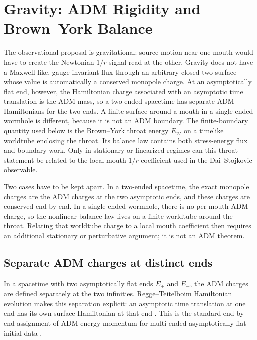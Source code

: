 \documentclass[aps,prd,10pt,onecolumn,nofootinbib,superscriptaddress,floatfix]{revtex4-2}
\begin{document}
\FloatBarrier

\section{Gravity: ADM Rigidity and Brown--York Balance}
\label{sec:gravity}

The observational proposal is gravitational: source motion near one mouth would
have to create the Newtonian $1/r$ signal read at the other.  Gravity does not
have a Maxwell-like, gauge-invariant flux through an arbitrary closed
two-surface whose value is automatically a conserved monopole charge.  At an
asymptotically flat end, however, the Hamiltonian charge associated with an
asymptotic time translation is the ADM mass, so a two-ended spacetime has
separate ADM Hamiltonians for the two ends.  A finite surface around a mouth in
a single-ended wormhole is different, because it is not an ADM boundary.  The
finite-boundary quantity used below is the Brown--York throat energy
$E_{\mathcal W}$ on a timelike worldtube enclosing the throat.  Its balance law
contains both stress-energy flux and boundary work.  Only in stationary or
linearized regimes can this throat statement be related to the local mouth
$1/r$ coefficient used in the Dai--Stojkovic observable.

Two cases have to be kept apart.  In a two-ended spacetime, the exact monopole
charges are the ADM charges at the two asymptotic ends, and these charges are
conserved end by end.  In a single-ended wormhole, there is no per-mouth ADM
charge, so the nonlinear balance law lives on a finite worldtube around the
throat.  Relating that worldtube charge to a local mouth coefficient then
requires an additional stationary or perturbative argument; it is not an ADM
theorem.

\subsection{Separate ADM charges at distinct ends}

In a spacetime with two asymptotically flat ends $E_+$ and $E_-$, the ADM
charges are defined separately at the two infinities.  Regge--Teitelboim
Hamiltonian evolution makes this separation explicit: an asymptotic time
translation at one end has its own surface Hamiltonian at that end
\cite{ReggeTeitelboim1974SurfaceIntegrals}.  This is the standard end-by-end
assignment of ADM energy-momentum for multi-ended asymptotically flat initial
data
\cite{ArnowittDeserMisner1962Dynamics,Wald1984GeneralRelativity,Bartnik1986Mass}.
\end{document}
